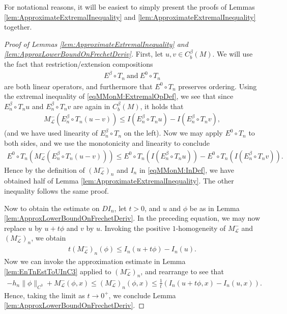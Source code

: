 \documentclass[11pt,reqno]{amsart}
\numberwithin{equation}{section}
\theoremstyle{plain}
\def\L{\mathcal L}
\newcommand{\norm}[1]{\lVert#1\rVert}
\begin{document}
For notational reasons, it will be easiest to simply present the proofs of Lemmas \ref{lem:ApproximateExtremalInequality} and \ref{lem:ApproximateExtremalInequality} together.

\begin{proof}[Proof of Lemmas \ref{lem:ApproximateExtremalInequality} and \ref{lem:ApproxLowerBoundOnFrechetDeriv}]
	First, let $u,v\in C^\beta_b(M)$.  We will use the fact that restriction/extension compositions
	\begin{align*}
		E^\beta\circ T_n\ \text{and}\ E^0\circ T_n
	\end{align*}
	are both linear operators, and furthermore that $E^0\circ T_n$ preserves ordering.  Using the extremal inequality of  \eqref{eqMMonM:ExtremalOpDef}, we see that since $E^\beta_n\circ T_n u$ and $E^\beta_n\circ T_n v$ are again in $C^\beta_b(M)$, it holds that
	\begin{align*}
		M^-_\L(E^\beta_n\circ T_n (u-v))\leq I(E^\beta_n\circ T_n u)-I(E^\beta_n\circ T_n v),
	\end{align*}
	(and we have used linearity of $E^\beta_n\circ T_n$ on the left).  Now we may apply $E^0\circ T_n$ to both sides, and we use the monotonicity and linearity to conclude 
	\begin{align*}
		E^0\circ T_n \left(M^-_\L(E^\beta_n\circ T_n (u-v))\right)\leq E^0\circ T_n\left(I(E^\beta_n\circ T_n u)\right)-E^0\circ T_n\left(I(E^\beta_n\circ T_n v)\right).
	\end{align*}
	Hence by the definition of $(M^-_\L)_n$ and $I_n$ in \eqref{eqMMonM:InDef}, we have obtained half of Lemma \ref{lem:ApproximateExtremalInequality}.  The other inequality follows the same proof.
	
	Now to obtain the estimate on $D I_n$, let $t>0$, and $u$ and $\phi$ be as in Lemma \ref{lem:ApproxLowerBoundOnFrechetDeriv}.  In the preceding equation, we may now replace $u$ by $u+t\phi$ and $v$ by $u$.  Invoking the positive $1$-homogeneity of $M^-_\L$ and $(M^-_\L)_n$, we obtain
		\begin{align*}
			t(M^-_\L)_n(\phi)\leq I_n(u + t\phi)-I_n( u).
		\end{align*}
		Now we can invoke the approximation estimate in Lemma \ref{lem:EnTnEstToUInC3} applied to $(M^-_\L)_n$, and rearrange to see that
		\begin{align*}
			-h_n\norm{\phi}_{C^3}+M^-_\L(\phi,x)\leq (M^-_\L)_n(\phi,x)\leq \frac{1}{t}\left(I_n(u + t\phi,x)-I_n( u,x)\right).
		\end{align*}
		Hence, taking the limit as $t\to0^+$, we conclude Lemma \ref{lem:ApproxLowerBoundOnFrechetDeriv}.
\end{proof}
\end{document}
